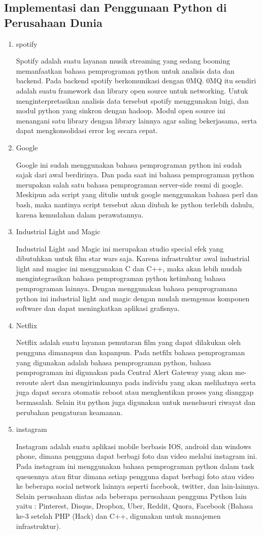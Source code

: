 \subsection{Implementasi dan Penggunaan Python di Perusahaan Dunia}
\begin{enumerate}
\item spotify 
\par
Spotify adalah suatu layanan musik streaming yang sedang booming memanfaatkan bahasa pemprograman python untuk analisis data dan backend. Pada backend spotify berkomunikasi dengan 0MQ. 0MQ itu sendiri adalah suatu framework dan library open source untuk networking. Untuk menginterpretasikan analisis data tersebut spotify menggunakan luigi, dan modul python yang sinkron dengan hadoop. Modul open source ini menangani satu library dengan library lainnya agar saling bekerjasama, serta dapat mengkonsolidasi error log secara cepat.
\item Google
\par 
Google ini sudah menggunakan bahasa pemprograman python ini sudah sajak dari awal berdirinya. Dan pada saat ini bahasa pemprograman python merupakan salah satu bahasa pemprograman server-side resmi di google. Meskipun ada script yang ditulis untuk google menggunakan bahasa perl dan bash, maka nantinya script tersebut akan diubah ke python terlebih dahulu, karena kemudahan dalam perawatannya.
\item Industrial Light and Magic
\par 
Industrial Light and Magic ini merupakan studio special efek yang dibutuhkan untuk film star wars saja. Karena infrastruktur awal industrial light and magisc ini menggunakan C dan C++, maka akan lebih mudah mengintegrasikan bahasa pemprograman python ketimbang bahasa pemprograman lainnya. Dengan menggunakan bahasa pemprogramana python ini industrial light and magic dengan mudah memgemas komponen software dan dapat meningkatkan aplikasi grafisnya. 
\item Netflix
\par 
Netflix adalah suatu layanan pemutaran film yang dapat dilakukan oleh pengguna dimanapun dan kapanpun. Pada netfilx bahasa pemprograman yang digunakan adalah bahasa pemprograman python, bahasa pemprograman ini digunakan pada Central Alert Gateway yang akan me-reroute alert dan mengirimkannya pada individu yang akan melihatnya serta juga  dapat secara otomatis reboot atau menghentikan proses yang dianggap bermasalah. Selain itu python juga digunakan untuk menelusuri riwayat dan perubahan pengaturan keamanan.
\item instagram 
\par 
Instagram adalah suatu aplikasi mobile berbasis IOS, android dan windows phone, dimana pengguna dapat berbagi foto dan video melalui instagram ini. Pada instagram ini menggunakan bahasa pemprograman python dalam task queuennya atau fitur dimana setiap pengguna dapat berbagi foto atau video ke beberapa social network lainnya seperti facebook, twitter, dan lain-lainnya.
Selain perusahaan diatas ada beberapa perusahaan pengguna Python lain yaitu : Pinterest, Disqus, Dropbox, Uber, Reddit, Quora, Facebook (Bahasa ke-3 setelah PHP (Hack) dan C++, digunakan untuk manajemen infrastruktur).


\end{enumerate}
